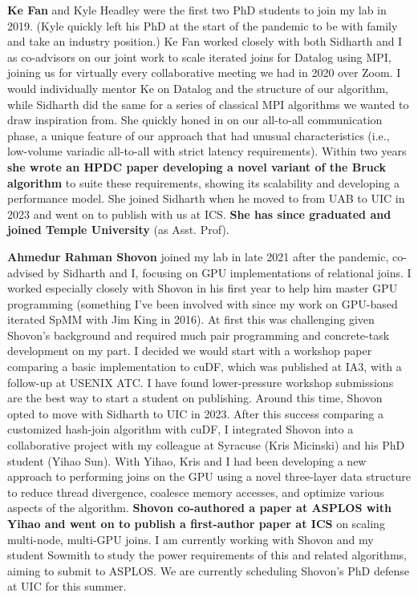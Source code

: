 \documentclass[12pt]{article}
\begin{document}
\textbf{Ke Fan} and Kyle Headley were the first two PhD students to join my lab in 2019. (Kyle quickly left his PhD at the start of the pandemic to be with family and take an industry position.) Ke Fan worked closely with both Sidharth and I as co-advisors on our joint work to scale iterated joins for Datalog using MPI, joining us for virtually every collaborative meeting we had in 2020 over Zoom. I would individually mentor Ke on Datalog and the structure of our algorithm, while Sidharth did the same for a series of classical MPI algorithms we wanted to draw inspiration from. She quickly honed in on our all-to-all communication phase, a unique feature of our approach that had unusual characteristics (i.e., low-volume variadic all-to-all with strict latency requirements). Within two years \textbf{she wrote an HPDC paper developing a novel variant of the Bruck algorithm} to suite these requirements, showing its scalability and developing a performance model. She joined Sidharth when he moved to from UAB to UIC in 2023 and went on to publish with us at ICS. \textbf{She has since graduated and joined Temple University} (as Asst. Prof).

\textbf{Ahmedur Rahman Shovon} joined my lab in late 2021 after the pandemic, co-advised by Sidharth and I, focusing on GPU implementations of relational joins. I worked especially closely with Shovon in his first year to help him master GPU programming (something I've been involved with since my work on GPU-based iterated SpMM with Jim King in 2016). At first this was challenging given Shovon's background and required much pair programming and concrete-task development on my part. I decided we would start with a workshop paper comparing a basic implementation to cuDF, which was published at IA3, with a follow-up at USENIX ATC. I have found lower-pressure workshop submissions are the best way to start a student on publishing. Around this time, Shovon opted to move with Sidharth to UIC in 2023. After this success comparing a customized hash-join algorithm with cuDF, I integrated Shovon into a collaborative project with my colleague at Syracuse (Kris Micinski) and his PhD student (Yihao Sun). With Yihao, Kris and I had been developing a new approach to performing joins on the GPU using a novel three-layer data structure to reduce thread divergence, coalesce memory accesses, and optimize various aspects of the algorithm. \textbf{Shovon co-authored a paper at ASPLOS with Yihao and went on to publish a first-author paper at ICS} on scaling multi-node, multi-GPU joins. I am currently working with Shovon and my student Sowmith to study the power requirements of this and related algorithms, aiming to submit to ASPLOS. We are currently scheduling Shovon's PhD defense at UIC for this summer. 
\end{document}
